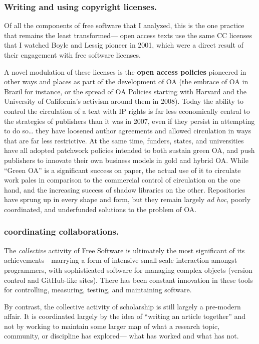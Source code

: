 \documentclass[11pt]{article}
\begin{document}
\subsubsection*{\textbf{Writing and using copyright licenses}.}
\label{sec:org567a31b}

Of all the components of free software that I analyzed, this is the one practice that remains the least transformed--- open access texts use the same CC licenses that I watched  Boyle and Lessig pioneer in 2001, which were a direct result of their engagement with free software licenses.

A novel modulation of these licenses is the \textbf{open access policies} pioneered in other ways and places as part of the development of OA (the embrace of OA in Brazil for instance, or the spread of OA Policies starting with Harvard and the University of California's activism around them in 2008).  Today the ability to control the circulation of a text with IP rights is far less economically central to the strategies of publishers than it was in 2007, even if they persist in attempting to do so\ldots{} they have loosened author agreements and allowed circulation in ways that are far less restrictive.  At the same time, funders, states, and universities have all adopted patchwork policies intended to both sustain green OA, and push publishers to innovate their own business models in gold and hybrid OA.  While ``Green OA'' is a significant success on paper, the actual use of it to circulate work pales in comparison to the commercial control of circulation on the one hand, and the increasing success of shadow libraries on the other. Repositories have sprung up in every shape and form, but they remain largely \emph{ad hoc}, poorly coordinated, and underfunded solutions to the problem of OA.

\subsubsection*{\textbf{coordinating collaborations}.}
\label{sec:org197ebf1}

The \emph{collective} activity of Free Software is ultimately the most significant of its achievements---marrying a form of intensive small-scale interaction amongst programmers, with sophisticated software for managing complex objects (version control and GitHub-like sites).  There has been constant innovation in these tools for controlling, measuring, testing, and maintaining software.

By contrast, the collective activity of scholarship is still largely a pre-modern affair.  It is coordinated largely by the idea of ``writing an article together'' and not by working to maintain some larger map of what a research topic, community, or discipline has explored--- what has worked and what has not. 
\end{document}
